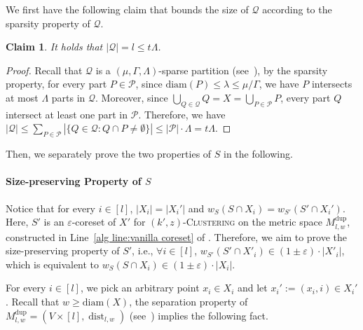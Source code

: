 \documentclass[letterpaper,11pt]{article}
\theoremstyle{plain}
\newtheorem{claim}[theorem]{Claim}
\theoremstyle{definition}
\theoremstyle{remark}
\DeclareMathOperator{\dist}{dist}
\newcommand{\diam}{\mathrm{diam}}
\newcommand{\dup}{\mathrm{dup}}
\newcommand{\multi}{\mathrm{dup}}
\newcommand{\eps}{\varepsilon}
\newcommand{\calP}{\mathcal{P}}
\newcommand{\calQ}{\mathcal{Q}}
\newcommand{\ProblemName}[1]{\textsc{#1}}
\newcommand{\tzC}[1]{\ProblemName{$(#1,z)$-Clustering}\xspace}
\begin{document}
We first have the following claim that bounds the size of $\calQ$ according to the sparsity property of $\calQ$.

\begin{claim}
    \label{claim:bounded Q}
    It holds that $|\calQ|=l\le t\Lambda$.
\end{claim}
\begin{proof}
    Recall that $\calQ$ is a $(\mu,\Gamma,\Lambda)$-sparse partition (see~), by the sparsity property, for every part $P\in\calP$, since $\diam(P)\le \lambda \le \mu/\Gamma$, we have $P$ intersects at most $\Lambda$ parts in $\calQ$. Moreover, since $\bigcup_{Q\in \calQ} Q = X = \bigcup_{P\in\calP} P$, every part $Q$ intersect at least one part in $\calP$. Therefore, we have $|\calQ| \le \sum_{P\in\calP} |\{Q\in \calQ: Q\cap P\neq \emptyset\}|\le |\calP|\cdot \Lambda=t\Lambda$.
\end{proof}


Then, we separately prove the two properties of $S$ in the following.

\paragraph{Size-preserving Property of $S$} 
Notice that for every $i \in [l]$, $|X_i| = |X_i'|$ and $w_S(S \cap X_i) = w_{S'}(S' \cap X_i')$. Here, $S'$ is an $\eps$-coreset of $X'$ for \tzC{k'} on the metric space $M^\dup_{l,w}$, constructed in Line~\ref{alg line:vanilla coreset} of . Therefore, we aim to prove the size-preserving property of $S'$, i.e., $\forall i\in [l]$, $w_{S'}(S'\cap X'_i)\in (1\pm \eps)\cdot |X'_i|$, which is equivalent to $w_{S}(S\cap X_i)\in (1\pm \eps)\cdot |X_i|$.


For every $i\in [l]$, we pick an arbitrary point $x_i\in X_i$ and let $x_i':=(x_i,i)\in X_i'$. 
Recall that $w\ge \diam(X)$, the separation property of $M^\multi_{l,w} = (V\times [l], \dist_{l,w})$ (see~) implies the following fact.
\end{document}
